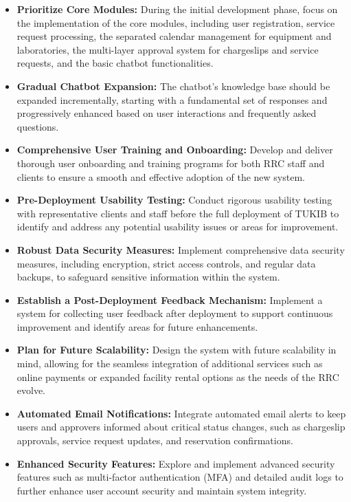 \begin{itemize}
\item \textbf{Prioritize Core Modules:} During the initial development phase, focus on the implementation of the core modules, including user registration, service request processing, the separated calendar management for equipment and laboratories, the multi-layer approval system for chargeslips and service requests, and the basic chatbot functionalities.
\item \textbf{Gradual Chatbot Expansion:} The chatbot's knowledge base should be expanded incrementally, starting with a fundamental set of responses and progressively enhanced based on user interactions and frequently asked questions.
\item \textbf{Comprehensive User Training and Onboarding:} Develop and deliver thorough user onboarding and training programs for both RRC staff and clients to ensure a smooth and effective adoption of the new system.
\item \textbf{Pre-Deployment Usability Testing:} Conduct rigorous usability testing with representative clients and staff before the full deployment of TUKIB to identify and address any potential usability issues or areas for improvement.
\item \textbf{Robust Data Security Measures:} Implement comprehensive data security measures, including encryption, strict access controls, and regular data backups, to safeguard sensitive information within the system.
\item \textbf{Establish a Post-Deployment Feedback Mechanism:} Implement a system for collecting user feedback after deployment to support continuous improvement and identify areas for future enhancements.
\item \textbf{Plan for Future Scalability:} Design the system with future scalability in mind, allowing for the seamless integration of additional services such as online payments or expanded facility rental options as the needs of the RRC evolve.
\item \textbf{Automated Email Notifications:} Integrate automated email alerts to keep users and approvers informed about critical status changes, such as chargeslip approvals, service request updates, and reservation confirmations.
\item \textbf{Enhanced Security Features:} Explore and implement advanced security features such as multi-factor authentication (MFA) and detailed audit logs to further enhance user account security and maintain system integrity.
\end{itemize}
